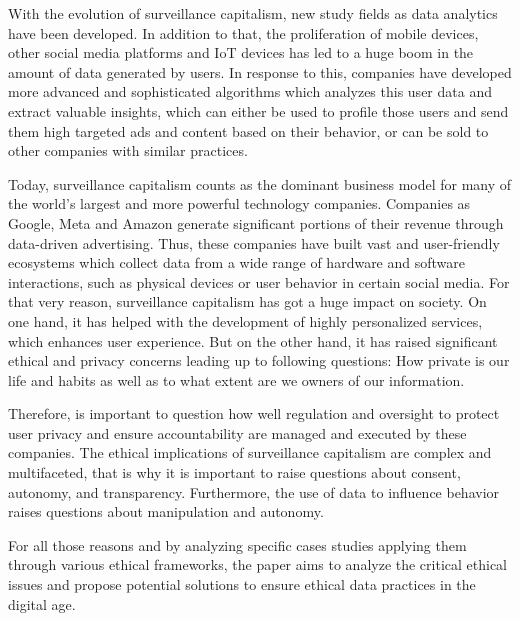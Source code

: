 With the evolution of surveillance capitalism, new study fields as data analytics have been developed.
In addition to that, the proliferation of mobile devices, other social media platforms and IoT devices has led to a huge boom in the amount of data generated by users.
In response to this, companies have developed more advanced and sophisticated algorithms which analyzes this user data and extract valuable insights, which can either be used to profile those users and send them high targeted ads and content based on their behavior, or can be sold to other companies with similar practices.

Today, surveillance capitalism counts as the dominant business model for many of the world's largest and more powerful technology companies.
Companies as Google, Meta and Amazon generate significant portions of their revenue through data-driven advertising.
Thus, these companies have built vast and user-friendly ecosystems which collect data from a wide range of hardware and software interactions, such as physical devices or user behavior in certain social media.
For that very reason, surveillance capitalism has got a huge impact on society.
On one hand, it has helped with the development of highly personalized services, which enhances user experience.
But on the other hand, it has raised significant ethical and privacy concerns leading up to following questions: How private is our life and habits as well as to what extent are we owners of our information.

Therefore, is important to question how well regulation and oversight to protect user privacy and ensure accountability are managed and executed by these companies.
The ethical implications of surveillance capitalism are complex and multifaceted, that is why it is important to raise questions about consent, autonomy, and transparency.
Furthermore, the use of data to influence behavior raises questions about manipulation and autonomy.

For all those reasons and by analyzing specific cases studies applying them through various ethical frameworks, the paper aims to analyze the critical ethical issues and propose potential solutions to ensure ethical data practices in the digital age.
\noindent

